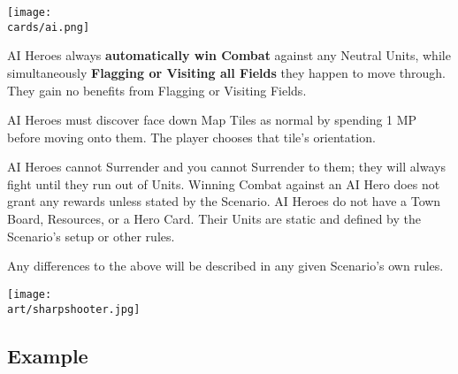\begin{multicols}{2}
\begin{center}
  \texttt{[image: \\cards/ai.png]}
\end{center}

AI Heroes always \textbf{automatically win Combat} against any Neutral Units, while simultaneously \textbf{Flagging or Visiting all Fields} they happen to move through.
They gain no benefits from Flagging or Visiting Fields.

AI Heroes must discover face down Map Tiles as normal by spending 1 MP before moving onto them.
The player chooses that tile's orientation.\par
AI Heroes cannot Surrender and you cannot Surrender to them;
they will always fight until they run out of Units.
Winning Combat against an AI Hero does not grant any rewards unless stated by the Scenario.
AI Heroes do not have a Town Board, Resources, or a Hero Card.
Their Units are static and defined by the Scenario's setup or other rules.\par
Any differences to the above will be described in any given Scenario's own rules.


\end{multicols}

\vspace*{\fill}
\begin{scaledfigure}[blanker]
  \centering
  \texttt{[image: \\art/sharpshooter.jpg]}
\end{scaledfigure}

\clearpage

\subsection*{Example}

